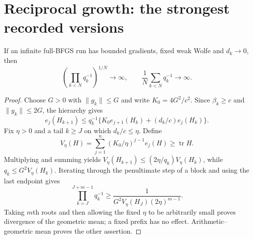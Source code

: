\section{Reciprocal growth: the strongest recorded versions}
\label{M:reciprocal}
\begin{theorem}\label{M:average}
If an infinite full-BFGS run has bounded gradients, fixed weak Wolfe and $d_k\to0$, then
\[
 \left(\prod_{k<N}q_k^{-1}\right)^{1/N}\to\infty,
 \qquad\frac1N\sum_{k<N}q_k^{-1}\to\infty.
\]
\end{theorem}
\begin{proof}
Choose $G>0$ with $\|g_k\|\le G$ and write $K_0=4G^2/c^2$. Since $\beta_k\ge c$ and $\|y_k\|\le2G$, the hierarchy gives
\[
 e_j(H_{k+1})\le q_k^{-1}\{K_0 e_{j+1}(H_k)+(d_k/c)e_j(H_k)\}.
\]
Fix $\eta>0$ and a tail $k\ge J$ on which $d_k/c\le\eta$. Define
\[
 V_\eta(H)=\sum_{j=1}^n(K_0/\eta)^{j-1}e_j(H)\ge\operatorname{tr}H.
\]
Multiplying and summing yields $V_\eta(H_{k+1})\le(2\eta/q_k)V_\eta(H_k)$, while $q_k\le G^2V_\eta(H_k)$. Iterating through the penultimate step of a block and using the last endpoint gives
\[
 \prod_{k=J}^{J+m-1}q_k^{-1}\ge\frac1{G^2V_\eta(H_J)(2\eta)^{m-1}}.
\]
Taking $m$th roots and then allowing the fixed $\eta$ to be arbitrarily small proves divergence of the geometric mean; a fixed prefix has no effect. Arithmetic--geometric mean proves the other assertion.
\end{proof}

